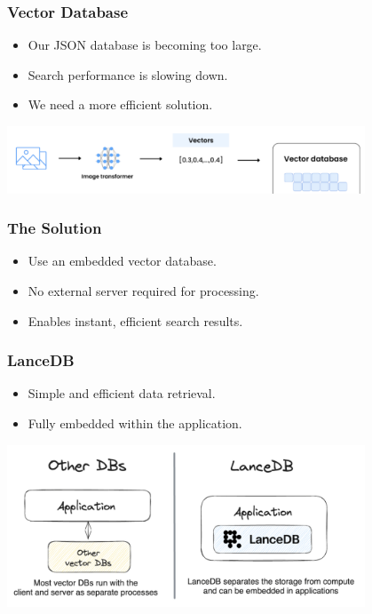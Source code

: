\begin{frame}
    \frametitle{Vector Database}
    \begin{itemize}
        \item Our JSON database is becoming too large.
        \item Search performance is slowing down.
        \item We need a more efficient solution.
    \end{itemize}
    \vspace{0.5cm}
    \centering
    \includegraphics[width=0.8\textwidth, keepaspectratio]{images/Vectordb.png}
\end{frame}

\begin{frame}
    \frametitle{The Solution}
    \begin{itemize}
        \item Use an embedded vector database.
        \item No external server required for processing.
        \item Enables instant, efficient search results.
    \end{itemize}
\end{frame}

\begin{frame}
    \frametitle{LanceDB}
    \begin{itemize}
        \item Simple and efficient data retrieval.
        \item Fully embedded within the application.
    \end{itemize}
    \vspace{0.5cm}
    \centering
    \includegraphics[width=0.8\textwidth, keepaspectratio]{images/vdbdiffernce.png}
\end{frame}


